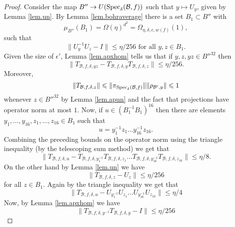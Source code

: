 \documentclass[12pt]{amsart}
\numberwithin{equation}{section}
\theoremstyle{plain}
\theoremstyle{definition}
\renewcommand{\leq}{\leqslant}
\providecommand{\Spec}{\mathop{\rm Spec}\nolimits}
\begin{document}
\begin{proof}
Consider the map $B'' \rightarrow U(\Spec_\delta(\mathcal{B},f))$ such that $y \mapsto U_y$, given by Lemma \ref{lem.un}.  By Lemma \ref{lem.bohraverage} there is a set $B_1 \subset B''$ with
\begin{equation*}
\mu_{B''}(B_1) = \Omega(\eta)^{d^2}=\Omega_{\eta,\delta,c,w(f)}(1),
\end{equation*}
such that
\begin{equation}\label{eqn.early}
\|U_{y}^{-1}U_z - I\| \leq \eta/256 \textrm{ for all } y,z \in B_1.
\end{equation}
Given the size of $\epsilon'$, Lemma \ref{lem.apxhom} tells us that if $y,z,yz \in B''^{32}$ then
\begin{equation*}
\|T_{\mathcal{B},f,\delta,yz} -T_{\mathcal{B},f,\delta,y}T_{\mathcal{B},f,\delta,z}\| \leq \eta/256.
\end{equation*}
Moreover,
\begin{equation*}
\|T_{\mathcal{B},f,\delta,z}\| \leq \| \pi_{\Spec_\delta(\mathcal{B},f)}\|\|\rho_{\mathcal{B}',y}\| \leq 1
\end{equation*}
whenever $z \in B''^{32}$ by Lemma \ref{lem.apun} and the fact that projections have operator norm at most $1$. Now, if $u \in (B_1^{-1}B_1)^{16}$ then there are elements $y_1,\dots,y_{16}, z_1,\dots,z_{16} \in B_1$ such that
\begin{equation*}
u=y_1^{-1}z_1\dots y_{16}^{-1}z_{16}.
\end{equation*}
Combining the preceding bounds on the operator norm using the triangle inequality (by the telescoping sum method) we get that
\begin{equation*}
\|T_{\mathcal{B},f,\delta,u}-T_{\mathcal{B},f,\delta,y_1^{-1}}T_{\mathcal{B},f,\delta,z_1}\dots T_{\mathcal{B},f,\delta,y_{16}^{-1}}T_{\mathcal{B},f,\delta,z_{16}}\| \leq \eta/8.
\end{equation*}
On the other hand by Lemma \ref{lem.un} we have
\begin{equation}\label{eqn.if}
\|T_{\mathcal{B},f,\delta,z} -U_{z}\| \leq \eta/256
\end{equation}
for all $z \in B_1$.  Again by the triangle inequality we get that
\begin{equation*}
\|T_{\mathcal{B},f,\delta,u}-U_{y_1^{-1}}U_{z_1}\dots U_{y_{16}^{-1}}U_{z_{16}}\|\leq \eta/4
\end{equation*}
Now, by Lemma \ref{lem.apxhom} we have
\begin{equation*}
\|T_{\mathcal{B},f,\delta,y^{-1}} T_{\mathcal{B},f,\delta,y} -I\| \leq \eta/256
\end{equation*}

\end{proof}
\end{document}

